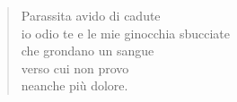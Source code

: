 
\begin{verse}
    Parassita avido di cadute\\
    io odio te e le mie ginocchia sbucciate\\
    che grondano un sangue\\
    verso cui non provo\\
    neanche più dolore.
\end{verse}